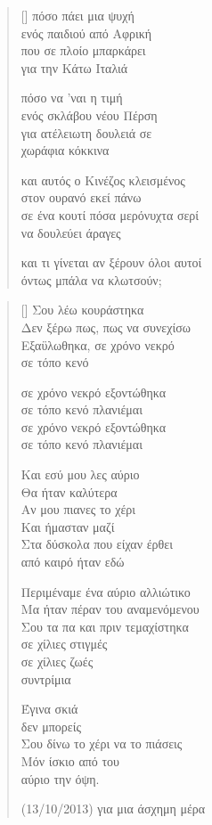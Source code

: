 \documentclass[12pt]{article}
\begin{document}
\settowidth{\versewidth}{και αυτός ο Κινέζος κλεισμένος}
\begin{verse}[\versewidth]
  πόσο πάει μια ψυχή \\
  ενός παιδιού από Αφρική \\
  που σε πλοίο μπαρκάρει \\
  για την Κάτω Ιταλιά

  πόσο να 'ναι η τιμή \\
  ενός σκλάβου νέου Πέρση \\
  για ατέλειωτη δουλειά σε \\
  χωράφια κόκκινα

  και αυτός ο Κινέζος κλεισμένος \\
  στον ουρανό εκεί πάνω \\
  σε ένα κουτί πόσα μερόνυχτα σερί \\
  να δουλεύει άραγες

  και τι γίνεται αν ξέρουν όλοι αυτοί \\
  όντως μπάλα να κλωτσούν;
\end{verse}

\newpage

\settowidth{\versewidth}{Περιμέναμε ένα αύριο αλλιώτικο}
\begin{verse}[\versewidth]
  Σου λέω κουράστηκα \\
  Δεν ξέρω πως, πως να συνεχίσω \\
  Εξαϋλωθηκα, σε χρόνο νεκρό \\
  σε τόπο κενό

  σε χρόνο νεκρό εξοντώθηκα \\
  σε τόπο κενό πλανιέμαι \\
  σε χρόνο νεκρό εξοντώθηκα \\
  σε τόπο κενό πλανιέμαι

  Και εσύ μου λες αύριο \\
  Θα ήταν καλύτερα \\
  Αν μου πιανες το χέρι \\
  Και ήμασταν μαζί \\
  Στα δύσκολα που είχαν έρθει \\
  από καιρό ήταν εδώ

  Περιμέναμε ένα αύριο αλλιώτικο \\
  Μα ήταν πέραν του αναμενόμενου \\
  Σου τα πα και πριν τεμαχίστηκα \\
  σε χίλιες στιγμές \\
  σε χίλιες ζωές \\
  συντρίμια

  Έγινα σκιά \\
  δεν μπορείς \\
  Σου δίνω το χέρι να το πιάσεις \\
  Μόν ίσκιο από του \\
  αύριο την όψη.

  (13/10/2013)
  για μια άσχημη μέρα
\end{verse}
\end{document}
